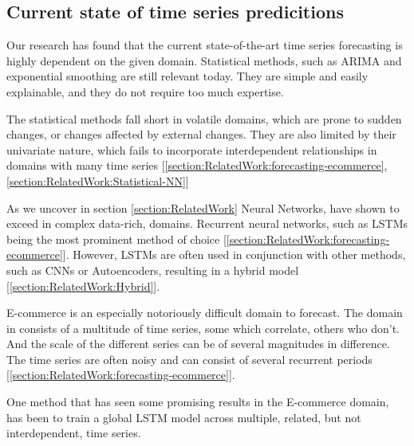 \subsection{Current state of time series predicitions}


Our research has found that the current state-of-the-art time series forecasting is highly dependent
on the given domain. Statistical methods, such as ARIMA and exponential smoothing 
are still relevant today. They are simple and easily explainable, and they do not require 
too much expertise.

The statistical methods fall short in volatile domains, which are prone to sudden changes,
or changes affected by external changes. They are also limited by their univariate nature, which fails to 
incorporate interdependent relationships in domains with many time series [\autoref{section:RelatedWork:forecasting-ecommerce}, \autoref{section:RelatedWork:Statistical-NN}]

As we uncover in section \autoref{section:RelatedWork} Neural Networks, have shown to exceed in complex data-rich, domains. Recurrent neural networks, such as LSTMs being the most
prominent method of choice [\autoref{section:RelatedWork:forecasting-ecommerce}]. However, LSTMs are often used in conjunction with other methods, such as CNNs or Autoencoders,
resulting in a hybrid model [\autoref{section:RelatedWork:Hybrid}].

E-commerce is an especially notoriously difficult domain to forecast. The domain in consists of a multitude of time series,
some which correlate, others who don't. And the scale of the different series can be of several magnitudes in difference.
The time series are often noisy and can consist of several recurrent periods [\autoref{section:RelatedWork:forecasting-ecommerce}].

One method that has seen some promising results in the E-commerce domain, has been to train a global LSTM model across multiple,
related, but not interdependent, time series.


